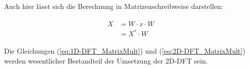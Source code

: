 Auch hier lässt sich die Berechnung in Matrizenschreibweise darstellen:

\begin{align}
\begin{split}\label{eq:2D-DFT_MatrixMult}
 X &= W \cdot x \cdot W \\
                    &= X^* \cdot W
\end{split}
\end{align}

Die Gleichungen (\ref{eq:1D-DFT_MatrixMult}) und (\ref{eq:2D-DFT_MatrixMult}) werden wesentlicher Bestandteil der Umsetzung der 2D-DFT sein.
% 
%   

